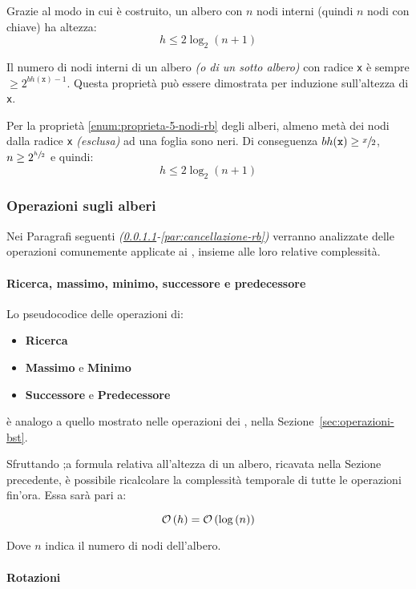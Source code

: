 \documentclass[italian, 10pt]{article}
\begin{document}
\bigskip
Grazie al modo in cui è costruito, un albero \RB con \(n\) nodi interni (quindi \(n\) nodi con chiave) ha altezza:
\[h \leq 2 \log_2{(n+1)}\]

Il numero di nodi interni di un albero \textit{(o di un sotto albero)} con radice \texttt{x} è sempre \(\geq 2^{bh(\texttt{x})-1}\).
Questa proprietà può essere dimostrata per induzione sull'altezza di \texttt{x}.

Per la proprietà \ref{enum:proprieta-5-nodi-rb} degli alberi, almeno metà dei nodi dalla radice \texttt{x} \textit{(esclusa)} ad una foglia sono neri.
Di conseguenza \(bh(\texttt{x}) \geq \sfrac{x}{2}\), \(n \geq 2^{\sfrac{h}{2}}\) e quindi:
\[ h \leq 2 \log_2{(n+1)} \]

\subsubsection{Operazioni sugli alberi \RB}

Nei Paragrafi seguenti \textit{(\ref{par:operazioni-rb-analoghe-a-bst}-\ref{par:cancellazione-rb})} verranno analizzate delle operazioni comunemente applicate ai \BST, insieme alle loro relative complessità.

\paragraph{Ricerca, massimo, minimo, successore e predecessore}
\label{par:operazioni-rb-analoghe-a-bst}

Lo pseudocodice delle operazioni di:

\begin{itemize}
  \item \textbf{Ricerca}
  \item \textbf{Massimo} e \textbf{Minimo}
  \item \textbf{Successore} e \textbf{Predecessore}
\end{itemize}

è analogo a quello mostrato nelle operazioni dei \BST, nella Sezione~\ref{sec:operazioni-bst}.

Sfruttando ;a formula relativa all'altezza di un albero, ricavata nella Sezione precedente, è possibile ricalcolare la complessità temporale di tutte le operazioni fin'ora.
Essa sarà pari a:

\[ \mathcal{O}\left(h\right) = \mathcal{O}\left(\log{(n)}\right)\]

Dove \(n\) indica il numero di nodi dell'albero.

\paragraph{Rotazioni}
\label{par:rotazioni-rb}
\end{document}
